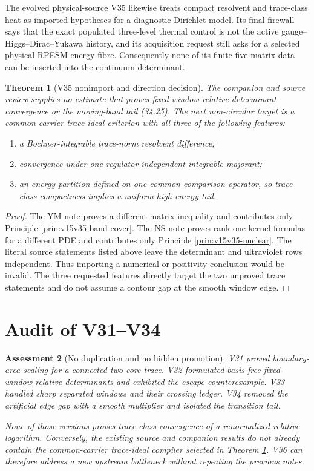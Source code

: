 \documentclass[11pt]{article}
\newtheorem{theorem}{Theorem}[section]
\newtheorem{assessment}[theorem]{Assessment}
\theoremstyle{remark}
\begin{document}
The evolved physical-source V35 likewise treats compact resolvent
and trace-class heat as imported hypotheses for a diagnostic
Dirichlet model.  Its final firewall says that the exact populated
three-level thermal control is not the active
gauge--Higgs--Dirac--Yukawa history, and its acquisition request
still asks for a selected physical RPESM energy fibre.  Consequently
none of its finite five-matrix data can be inserted into the
continuum determinant.

\begin{theorem}[V35 nonimport and direction decision]
\label{thm:v15v35-audit-decision}
The companion and source review supplies no estimate that proves
fixed-window relative determinant convergence or the moving-band
tail (34.25).  The next non-circular target is a common-carrier
trace-ideal criterion with all three of the following features:
\begin{enumerate}
\item a Bochner-integrable trace-norm resolvent difference;
\item convergence under one regulator-independent integrable
      majorant;
\item an energy partition defined on one common comparison
      operator, so trace-class compactness implies a uniform
      high-energy tail.
\end{enumerate}
\end{theorem}

\begin{proof}
The YM note proves a different matrix inequality and contributes
only Principle \ref{prin:v15v35-band-cover}.  The NS note proves
rank-one kernel formulas for a different PDE and contributes only
Principle \ref{prin:v15v35-nuclear}.  The literal source statements
listed above leave the determinant and ultraviolet rows independent.
Thus importing a numerical or positivity conclusion would be
invalid.  The three requested features directly target the two
unproved trace statements and do not assume a contour gap at the
smooth window edge.
\end{proof}

\section{Audit of V31--V34}

\begin{assessment}[No duplication and no hidden promotion]
\label{ass:v15v35-cycle-audit}
V31 proved boundary-area scaling for a connected two-core trace.
V32 formulated basis-free fixed-window relative determinants and
exhibited the escape counterexample.  V33 handled sharp separated
windows and their crossing ledger.  V34 removed the artificial edge
gap with a smooth multiplier and isolated the transition tail.

None of those versions proves trace-class convergence of a
renormalized relative logarithm.  Conversely, the existing source
and companion results do not already contain the common-carrier
trace-ideal compiler selected in Theorem
\ref{thm:v15v35-audit-decision}.  V36 can therefore address a new
upstream bottleneck without repeating the previous notes.
\end{assessment}
\end{document}
